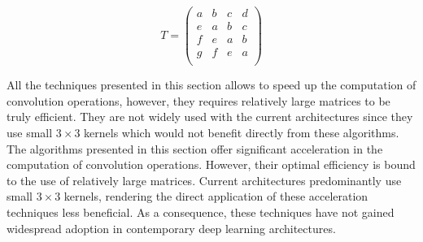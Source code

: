 $$
T = 
\left(
\begin{array}{cccc}
a & b & c & d \\
e & a & b & c \\
f & e & a & b \\
g & f & e & a \\
\end{array}
\right)
$$

All the techniques presented in this section allows to speed up the computation
of convolution operations, however, they requires relatively large matrices to
be truly efficient. They are not widely used with the current architectures
\cite{DBLP:conf/cvpr/HeZRS16,huang2017densely,liu2018efficient} since they use
small $3 \times 3$ kernels which would not benefit directly from these
algorithms.\\


The algorithms presented in this section offer significant acceleration in the
computation of convolution operations. However, their optimal efficiency is
bound to the use of relatively large matrices. Current architectures
\cite{DBLP:conf/cvpr/HeZRS16, huang2017densely, liu2018efficient} predominantly
use small $3 \times 3$ kernels, rendering the direct application of these
acceleration techniques less beneficial. As a consequence, these techniques have
not gained widespread adoption in contemporary deep learning architectures.